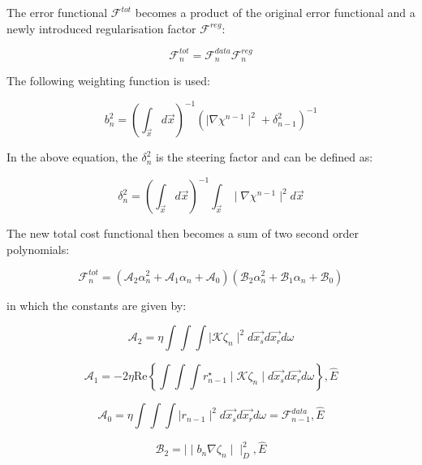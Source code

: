 \documentclass[10pt,a4paper]{article}
\newcommand{\real}[1]{\text{Re} \left\{ #1 \right\}}
\begin{document}
The error functional $\mathcal{F}^{tot}$ becomes a product of the original error functional and a newly introduced regularisation factor $\mathcal{F}^{reg}$:

\begin{equation} \label{eq:eq20} \mathcal{F}^{tot}_n = \mathcal{F}^{data}_n \mathcal{F}^{reg}_n \end{equation} 

The following weighting function is used:

\begin{equation} \label{eq:eq21} b_n^{2} = (\int_{\vec{x}} d\vec{x})^{-1} (\mid\nabla\chi^{n-1}\mid^2 + \delta_{n-1}^2)^{-1} \end{equation} 

In the above equation, the $\delta_{n}^2$ is the steering factor and can be defined as:

\begin{equation} \label{eq:eq22} \delta_{n}^2 = (\int_{\vec{x}} d\vec{x})^{-1} \int_{\vec{x}} \mid\nabla\chi^{n-1}\mid^2 d\vec{x} \end{equation} 

The new total cost functional then becomes a sum of two second order polynomials:

\begin{equation} \label{eq:eq23} \mathcal{F}^{tot}_n = (\mathcal{A}_2\alpha^{2}_n + \mathcal{A}_1\alpha_n +\mathcal{A}_0)(\mathcal{B}_2\alpha^{2}_n + \mathcal{B}_1\alpha_n + \mathcal{B}_0) \end{equation} 

in which the constants are given by:

\begin{equation} \label{eq:eq24} \mathcal{A}_2 = \eta \int \int \int \mid \mathcal{K} \zeta_n \mid^2 d\vec{x_s}d\vec{x_r}d\omega \end{equation} 

\begin{equation} \label{eq:eq25} \mathcal{A}_1 = -2 \eta \real{\int \int \int r^{\star}_{n-1} \mid \mathcal{K} \zeta_n \mid d\vec{x_s}d\vec{x_r}d\omega} , \hat{E} \end{equation} 

\begin{equation} \label{eq:eq26} \mathcal{A}_0 = \eta \int \int \int \mid r_{n-1} \mid^2 d\vec{x_s}d\vec{x_r}d\omega =  \mathcal{F}^{data}_{n-1} , \hat{E} \end{equation} 

\begin{equation} \label{eq:eq27} \mathcal{B}_2 = \mid \mid b_n \nabla \zeta_n \mid \mid^{2}_D , \hat{E} \end{equation} 
\end{document}
